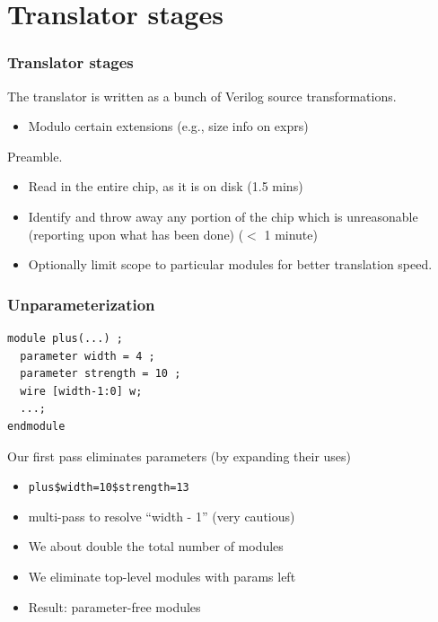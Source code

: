 \documentclass[mathserif]{beamer}
\begin{document}
\section[Translator stages]{Translator stages}
\begin{frame}
\frametitle{Translator stages}

The translator is written as a bunch of Verilog source transformations. 
\begin{itemize}
\item Modulo certain extensions (e.g., size info on exprs)
\end{itemize}

\bigskip
Preamble.
\begin{itemize}
\item Read in the entire chip, as it is on disk (1.5 mins)
\item Identify and throw away any portion of the chip which is unreasonable
  (reporting upon what has been done)  ($<$ 1 minute)
\item Optionally limit scope to particular modules for better translation
  speed.
\end{itemize}

\end{frame}



\begin{frame}[fragile]
\frametitle{Unparameterization}
\begin{verbatim}
module plus(...) ;
  parameter width = 4 ;
  parameter strength = 10 ;
  wire [width-1:0] w;
  ...;
endmodule
\end{verbatim}

\bigskip

Our first pass eliminates parameters (by expanding their uses)
\begin{itemize}
\item \texttt{plus\$width=10\$strength=13}
\item multi-pass to resolve ``width - 1'' (very cautious)
\item We about double the total number of modules
\item We eliminate top-level modules with params left
\item Result: parameter-free modules
\end{itemize}

\end{frame}
\end{document}
